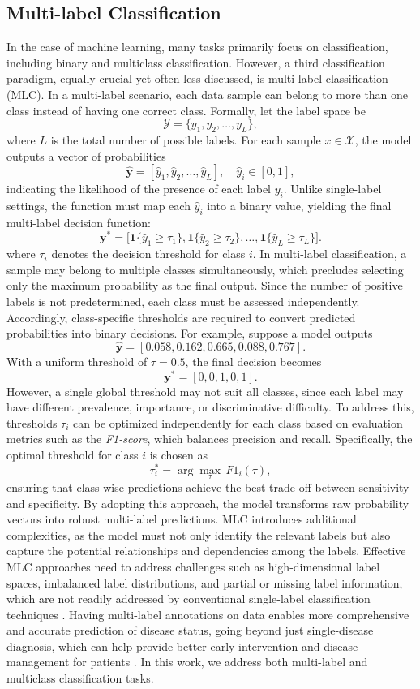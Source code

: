 \documentclass[a4paper,fleqn]{cas-dc}
\begin{document}
\subsection{Multi-label Classification}
In the case of machine learning, many tasks primarily focus on classification, including binary and multiclass classification. However, a third classification paradigm, equally crucial yet often less discussed, is multi-label classification (MLC). In a multi-label scenario, each data sample can belong to more than one class instead of having one correct class. Formally, let the label space be
\[
\mathcal{Y} = \{y_1, y_2, \dots, y_L\},
\]
where $L$ is the total number of possible labels. For each sample $x \in \mathcal{X}$, the model outputs a vector of probabilities
\[
\hat{\mathbf{y}} = [\hat{y}_1, \hat{y}_2, \dots, \hat{y}_L], \quad \hat{y}_i \in [0,1],
\]
indicating the likelihood of the presence of each label $y_i$. Unlike single-label settings, the function must map each $\hat{y}_i$ into a binary value, yielding the final multi-label decision function:
\[
\mathbf{y}^\ast =
\big[ \mathbf{1}\{\hat{y}_1 \geq \tau_1\},
      \mathbf{1}\{\hat{y}_2 \geq \tau_2\},
      \dots,
      \mathbf{1}\{\hat{y}_L \geq \tau_L\} \big].
\]
where $\tau_i$ denotes the decision threshold for class $i$. In multi-label classification, a sample may belong to multiple classes simultaneously, which precludes selecting only the maximum probability as the final output. Since the number of positive labels is not predetermined, each class must be assessed independently. Accordingly, class-specific thresholds are required to convert predicted probabilities into binary decisions. For example, suppose a model outputs
\[
\hat{\mathbf{y}} = [0.058, 0.162, 0.665, 0.088, 0.767].
\]
With a uniform threshold of $\tau = 0.5$, the final decision becomes
\[
\mathbf{y}^\ast = [0, 0, 1, 0, 1].
\]
However, a single global threshold may not suit all classes, since each label may have different prevalence, importance, or discriminative difficulty. To address this, thresholds $\tau_i$ can be optimized independently for each class based on evaluation metrics such as the \textit{F1-score}, which balances precision and recall. Specifically, the optimal threshold for class $i$ is chosen as
\[
\tau_i^\ast = \arg\max_{\tau} \, F1_i(\tau),
\]
ensuring that class-wise predictions achieve the best trade-off between sensitivity and specificity. By adopting this approach, the model transforms raw probability vectors into robust multi-label predictions. MLC introduces additional complexities, as the model must not only identify the relevant labels but also capture the potential relationships and dependencies among the labels. Effective MLC approaches need to address challenges such as high-dimensional label spaces, imbalanced label distributions, and partial or missing label information, which are not readily addressed by conventional single-label classification techniques \cite{tarekegn2024deep}. Having multi-label annotations on data enables more comprehensive and accurate prediction of disease status, going beyond just single-disease diagnosis, which can help provide better early intervention and disease management for patients \cite{maxwell2017deep}. In this work, we address both multi-label and multiclass classification tasks.
\end{document}
